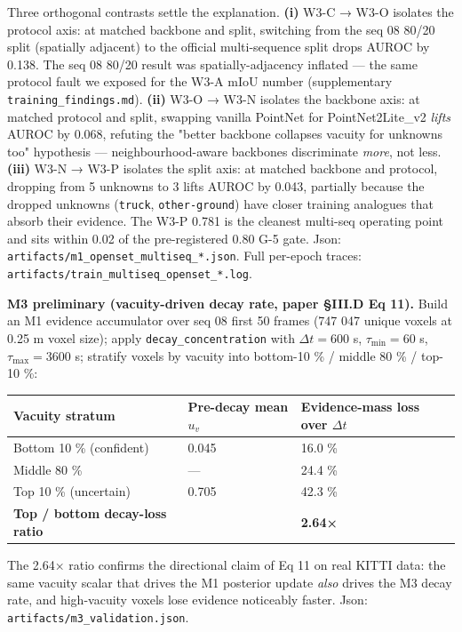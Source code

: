 \documentclass[
]{article}
\newcounter{none} %
\begin{document}
Three orthogonal contrasts settle the explanation. \textbf{(i)} W3-C →
W3-O isolates the protocol axis: at matched backbone and split,
switching from the seq 08 80/20 split (spatially adjacent) to the
official multi-sequence split drops AUROC by 0.138. The seq 08 80/20
result was spatially-adjacency inflated --- the same protocol fault we
exposed for the W3-A mIoU number (supplementary
\texttt{training\_findings.md}). \textbf{(ii)} W3-O → W3-N isolates the
backbone axis: at matched protocol and split, swapping vanilla PointNet
for PointNet2Lite\_v2 \emph{lifts} AUROC by 0.068, refuting the "better
backbone collapses vacuity for unknowns too" hypothesis ---
neighbourhood-aware backbones discriminate \emph{more}, not less.
\textbf{(iii)} W3-N → W3-P isolates the split axis: at matched backbone
and protocol, dropping from 5 unknowns to 3 lifts AUROC by 0.043,
partially because the dropped unknowns (\texttt{truck},
\texttt{other-ground}) have closer training analogues that absorb their
evidence. The W3-P 0.781 is the cleanest multi-seq operating point and
sits within 0.02 of the pre-registered 0.80 G-5 gate. Json:
\texttt{artifacts/m1\_openset\_multiseq\_*.json}. Full per-epoch traces:
\texttt{artifacts/train\_multiseq\_openset\_*.log}.

\textbf{M3 preliminary (vacuity-driven decay rate, paper §III.D Eq 11).}
Build an M1 evidence accumulator over seq 08 first 50 frames (747 047
unique voxels at 0.25 m voxel size); apply \texttt{decay\_concentration}
with \(\Delta t = 600\) s, \(\tau_{\min} = 60\) s,
\(\tau_{\max} = 3600\) s; stratify voxels by vacuity into bottom-10 \% /
middle 80 \% / top-10 \%:

{\def\LTcaptype{none} %
\begin{longtable}[]{@{}lll@{}}
\toprule\noalign{}
Vacuity stratum & Pre-decay mean \(u_v\) & Evidence-mass loss over
\(\Delta t\) \\
\midrule\noalign{}
\endhead
\bottomrule\noalign{}
\endlastfoot
Bottom 10 \% (confident) & 0.045 & 16.0 \% \\
Middle 80 \% & --- & 24.4 \% \\
Top 10 \% (uncertain) & 0.705 & 42.3 \% \\
\textbf{Top / bottom decay-loss ratio} & & \textbf{2.64×} \\
\end{longtable}
}

The 2.64× ratio confirms the directional claim of Eq 11 on real KITTI
data: the same vacuity scalar that drives the M1 posterior update
\emph{also} drives the M3 decay rate, and high-vacuity voxels lose
evidence noticeably faster. Json:
\texttt{artifacts/m3\_validation.json}.
\end{document}
